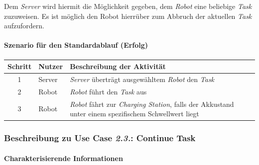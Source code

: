 				Dem \emph{Server} wird hiermit die Möglichkeit gegeben, dem \emph{Robot} eine beliebige \emph{Task} zuzuweisen. Es ist möglich den Robot hierrüber zum Abbruch der aktuellen \emph{Task} aufzufordern.

				\paragraph*{Szenario für den Standardablauf (Erfolg)}

				\begin{table}[H]
					\centering
					\begin{tabularx}{\textwidth}{|c|p{2cm}|X|}
						\hline
						Schritt & Nutzer & Beschreibung der Aktivität \\ \hline
						1 & Server & \emph{Server} überträgt ausgewähltem \emph{Robot} den \emph{Task} \\
						2 & Robot & \emph{Robot} führt den \emph{Task} aus \\
						3 & Robot & \emph{Robot} fährt zur \emph{Charging Station}, falls der Akkustand unter einem spezifischem Schwellwert liegt\\
						\hline
					\end{tabularx}
				\end{table}


				\pagebreak


			\subsubsection{Beschreibung zu Use Case \emph{2.3.}: Continue Task}

			\paragraph*{Charakterisierende Informationen}

